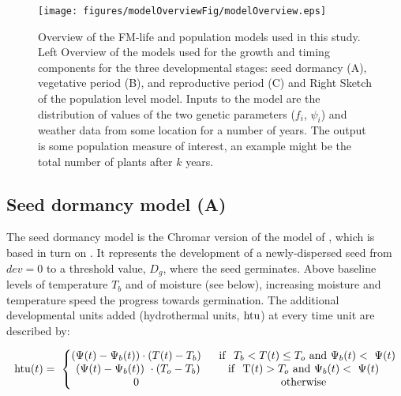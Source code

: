\begin{figure}[tb]
  \centering
\texttt{[image: figures/modelOverviewFig/modelOverview.eps]}
\caption{Overview of the FM-life and population models used in this study. Left
  Overview of the models used for the growth and timing components for the three
  developmental stages: seed dormancy (A), vegetative period (B), and
  reproductive period (C) and Right Sketch of the population level model. Inputs
  to the model are the distribution of values of the two genetic parameters
  (\(f_{i}\), \(\psi_{i}\)) and weather data from some location for a number of
  years. The output is some population measure of interest, an example might be
  the total number of plants after \(k\) years.}
\label{fig:overview}
\end{figure}

\subsection{Seed dormancy model (A)}
\label{seed-dormancy-model-a}

The seed dormancy model is the Chromar version of the model of
\citet{burghardt_modeling_2015}, which is based in turn on
\citet{alvarado_hydrothermal_2002}. It represents the development of a
newly-dispersed seed from \(dev = 0\) to a threshold value, \(D_{g}\), where the
seed germinates. Above baseline levels of temperature $T_b$ and of moisture (see
below), increasing moisture and temperature speed the progress towards
germination. The additional developmental units added (hydrothermal units,
\(\mathrm{htu}\)) at every time unit are described by:

\[\mathrm{htu}( t ) = \ \left\{ \begin{matrix}
( \Psi( t ) - \Psi_{b}( t ) ) \cdot ( T( t ) - T_{b} ) \\
\ ( \Psi( t ) - \Psi_{b}( t ) )\  \cdot ( T_{o} - T_{b} ) \\
0 \\
\end{matrix} \right.\ \ \begin{matrix}
\mathrm{\ \ if\ \ }T_{b} < T( t ) \leq T_{o}\ \mathrm{and}\ \Psi_{b}( t ) < \ \Psi(t) \\
\mathrm{if\ \ T}( t ) > T_{o}\ \mathrm{and}\ \Psi_{b}( t ) < \ \Psi( t ) \\
\mathrm{otherwise} \\
\end{matrix}\]

